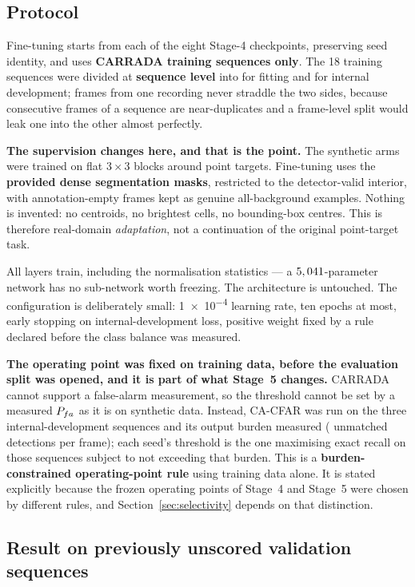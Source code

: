 \subsection{Protocol}

Fine-tuning starts from each of the eight Stage-4 checkpoints, preserving seed identity, and uses
\textbf{CARRADA training sequences only}. The 18 training sequences were divided at \textbf{sequence
level} into \FtFitSeq{} for fitting and \FtDevSeq{} for internal development; frames from one
recording never straddle the two sides, because consecutive frames of a sequence are near-duplicates
and a frame-level split would leak one into the other almost perfectly.

\textbf{The supervision changes here, and that is the point.} The synthetic arms were trained on flat
$3\times3$ blocks around point targets. Fine-tuning uses the \textbf{provided dense segmentation
masks}, restricted to the detector-valid interior, with annotation-empty frames kept as genuine
all-background examples. Nothing is invented: no centroids, no brightest cells, no bounding-box
centres. This is therefore real-domain \emph{adaptation}, not a continuation of the original
point-target task.

All layers train, including the normalisation statistics --- a $5,041$-parameter network has no
sub-network worth freezing. The architecture is untouched. The configuration is deliberately small:
\num{1e-4} learning rate, ten epochs at most, early stopping on internal-development loss, positive
weight \FtPosWeight{} fixed by a rule declared before the class balance was measured.

\textbf{The operating point was fixed on training data, before the evaluation split was opened, and
it is part of what Stage~5 changes.} CARRADA cannot support a false-alarm measurement, so the
threshold cannot be set by a measured $P_{fa}$ as it is on synthetic data. Instead, CA-CFAR was run on
the three internal-development sequences and its output burden measured (\FtCaDevBurden{} unmatched
detections per frame); each seed's threshold is the one maximising exact recall on those sequences
subject to not exceeding that burden. This is a \textbf{burden-constrained operating-point rule}
using training data alone. It is stated explicitly because the frozen operating points of Stage~4 and
Stage~5 were chosen by different rules, and Section~\ref{sec:selectivity} depends on that
distinction.

\subsection{Result on previously unscored validation sequences}

